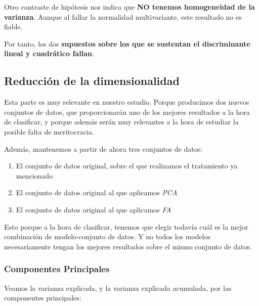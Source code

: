 \documentclass[11pt]{article}
\begin{document}
Otro contraste de hipótesis nos indica que \textbf{NO tenemos homogeneidad de la varianza}. Aunque al fallar la normalidad multivariante, este resultado no es fiable.

Por tanto, los dos \textbf{supuestos sobre los que se sustentan el discriminante lineal y cuadrático fallan}.


\subsection{Reducción de la dimensionalidad}

Esta parte es muy relevante en nuestro estudio. Porque producimos dos nuevos conjuntos de datos, que proporcionarán uno de los mejores resultados a la hora de clasificar, y porque además serán muy relevantes a la hora de estudiar la posible falta de meritocracia.

Además, mantenemos a partir de ahora tres conjuntos de datos:

\begin{enumerate}
    \item El conjunto de datos original, sobre el que realizamos el tratamiento ya mencionado
    \item El conjunto de datos original al que aplicamos \textit{PCA}
    \item El conjunto de datos original al que aplicamos \textit{FA}
\end{enumerate}

Esto porque a la hora de clasificar, tenemos que elegir todavía cuál es la mejor combinación de modelo-conjunto de datos. Y no todos los modelos necesariamente tengan los mejores resultados sobre el mismo conjunto de datos.

\subsubsection{Componentes Principales}

Veamos la varianza explicada, y la varianza explicada acumulada, por las componentes principales:
\end{document}
